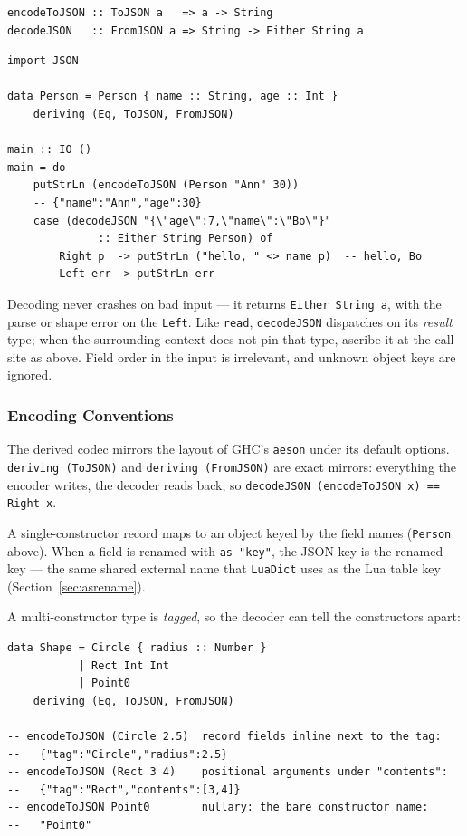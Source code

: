 \documentclass[11pt,a4paper]{article}
\begin{document}
\begin{lstlisting}
encodeToJSON :: ToJSON a   => a -> String
decodeJSON   :: FromJSON a => String -> Either String a
\end{lstlisting}

\begin{lstlisting}
import JSON

data Person = Person { name :: String, age :: Int }
    deriving (Eq, ToJSON, FromJSON)

main :: IO ()
main = do
    putStrLn (encodeToJSON (Person "Ann" 30))
    -- {"name":"Ann","age":30}
    case (decodeJSON "{\"age\":7,\"name\":\"Bo\"}"
              :: Either String Person) of
        Right p  -> putStrLn ("hello, " <> name p)  -- hello, Bo
        Left err -> putStrLn err
\end{lstlisting}

Decoding never crashes on bad input --- it returns
\texttt{Either String a}, with the parse or shape error on the
\texttt{Left}.  Like \texttt{read}, \texttt{decodeJSON} dispatches on
its \emph{result} type; when the surrounding context does not pin that
type, ascribe it at the call site as above.  Field order in the input
is irrelevant, and unknown object keys are ignored.

\subsubsection{Encoding Conventions}

The derived codec mirrors the layout of GHC's \texttt{aeson} under its
default options.  \texttt{deriving (ToJSON)} and
\texttt{deriving (FromJSON)} are exact mirrors: everything the encoder
writes, the decoder reads back, so
\texttt{decodeJSON (encodeToJSON x) == Right x}.

A single-constructor record maps to an object keyed by the field names
(\texttt{Person} above).  When a field is renamed with \texttt{as
"key"}, the JSON key is the renamed key --- the same shared external
name that \texttt{LuaDict} uses as the Lua table key
(Section~\ref{sec:asrename}).

A multi-constructor type is \emph{tagged}, so the decoder can tell the
constructors apart:

\begin{lstlisting}
data Shape = Circle { radius :: Number }
           | Rect Int Int
           | Point0
    deriving (Eq, ToJSON, FromJSON)

-- encodeToJSON (Circle 2.5)  record fields inline next to the tag:
--   {"tag":"Circle","radius":2.5}
-- encodeToJSON (Rect 3 4)    positional arguments under "contents":
--   {"tag":"Rect","contents":[3,4]}
-- encodeToJSON Point0        nullary: the bare constructor name:
--   "Point0"
\end{lstlisting}
\end{document}
